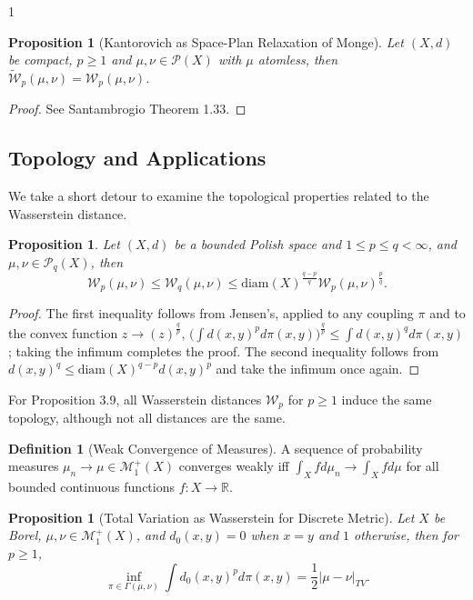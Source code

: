 \documentclass[12pt]{article}
\newtheorem{proposition}[theorem]{Proposition}
\theoremstyle{definition}
\newtheorem{definition}[theorem]{Definition}
\theoremstyle{plain}
\begin{document}
\begin{spacing}{1}
{\begin{proposition}[Kantorovich as Space-Plan Relaxation of Monge]
    Let $(X, d)$ be compact, $p \geq 1$ and $\mu, \nu \in \mathcal{P}(X)$ with $\mu$ atomless, then $\tilde{\mathcal{W}}_p(\mu, \nu) = \mathcal{W}_p(\mu, \nu)$.
\end{proposition}

\begin{proof}
    See Santambrogio \cite{santambrogio} Theorem 1.33.
\end{proof}

\subsection{Topology and Applications}
We take a short detour to examine the topological properties related to the Wasserstein distance. 

\begin{proposition}
    Let $(X, d)$ be a bounded Polish space and $1 \leq p \leq q < \infty$, and $\mu, \nu \in \mathcal{P}_q(X)$, then
    \[
    \mathcal{W}_p(\mu, \nu) \leq \mathcal{W}_q(\mu, \nu) \leq \text{diam}(X)^\frac{q - p}{q} \mathcal{W}_p(\mu, \nu)^\frac{p}{q}.
    \]
\end{proposition}

\begin{proof}
    The first inequality follows from Jensen's, applied to any coupling $\pi$ and to the convex function $z \rightarrow (z)^\frac{q}{p}$, $\bigg ( \displaystyle \int d(x, y)^p d\pi(x, y)\bigg )^\frac{q}{p} \leq \int d(x, y)^q d\pi(x, y)$; taking the infimum completes the proof. The second inequality follows from $d(x, y)^q \leq \text{diam}(X)^{q - p} d(x, y)^p$ and take the infimum once again.
\end{proof}

For Proposition 3.9, all Wasserstein distances $\mathcal{W}_p$ for $p \geq 1$ induce the same topology, although not all distances are the same.

\begin{definition}[Weak Convergence of Measures]
    A sequence of probability measures $\mu_n \rightarrow \mu \in \mathcal{M}_1^+(X)$ converges weakly iff $\displaystyle \int_X f d\mu_n \rightarrow \int_X f d\mu$ for all bounded continuous functions $f: X \rightarrow \mathbb{R}$.
\end{definition}

\begin{proposition}[Total Variation as Wasserstein for Discrete Metric]
    Let $X$ be Borel, $\mu, \nu \in \mathcal{M}_1^+(X)$, and $d_0(x, y) = 0$ when $x = y$ and $1$ otherwise, then for $p \geq 1$,
    \[
    \inf_{\pi \in \Gamma(\mu, \nu)} \displaystyle \int d_0(x, y)^p d\pi(x,y) = \frac{1}{2} \lvert \mu - \nu \rvert_{TV}.
    \]
\end{proposition}

}
\end{spacing}
\end{document}
